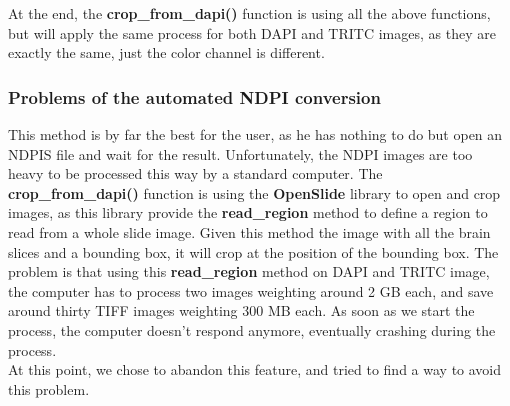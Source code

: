 \documentclass[a4paper,12pt]{report}
\begin{document}
At the end, the \textbf{crop\_from\_dapi()} function is using all the above functions, but will apply the same process for both DAPI and TRITC images, as they are exactly the same, just the color channel is different. \\

\subsubsection{Problems of the automated NDPI conversion}
This method is by far the best for the user, as he has nothing to do but open an NDPIS file and wait for the result. Unfortunately, the NDPI images are too heavy to be processed this way by a standard computer. The \textbf{crop\_from\_dapi()} function is using the \textbf{OpenSlide} library to open and crop images, as this library provide the \textbf{read\_region} method to define a region to read from a whole slide image. Given this method the image with all the brain slices and a bounding box, it will crop at the position of the bounding box. The problem is that using this \textbf{read\_region} method on DAPI and TRITC image, the computer has to process two images weighting around 2 GB each, and save around thirty TIFF images weighting 300 MB each. As soon as we start the process, the computer doesn't respond anymore, eventually crashing during the process. \\
\indent At this point, we chose to abandon this feature, and tried to find a way to avoid this problem. \\
\end{document}
